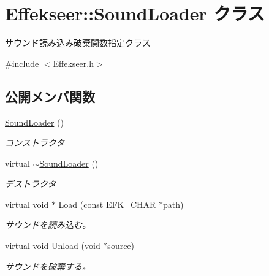 \hypertarget{class_effekseer_1_1_sound_loader}{}\section{Effekseer\+:\+:Sound\+Loader クラス}
\label{class_effekseer_1_1_sound_loader}


サウンド読み込み破棄関数指定クラス  




{\ttfamily \#include $<$Effekseer.\+h$>$}

\subsection*{公開メンバ関数}
\begin{DoxyCompactItemize}
\item 
\mbox{\hyperlink{class_effekseer_1_1_sound_loader_a8c1e855efae5426d991a534950ffd0d2}{Sound\+Loader}} ()
\begin{DoxyCompactList}\small\item\em コンストラクタ \end{DoxyCompactList}\item 
virtual \mbox{\hyperlink{class_effekseer_1_1_sound_loader_af0d4636a5348e45dfadf0e0a8847d4c1}{$\sim$\+Sound\+Loader}} ()
\begin{DoxyCompactList}\small\item\em デストラクタ \end{DoxyCompactList}\item 
virtual \mbox{\hyperlink{namespace_effekseer_ab34c4088e512200cf4c2716f168deb56}{void}} $\ast$ \mbox{\hyperlink{class_effekseer_1_1_sound_loader_a871ad4843c0dee971d897a654643bdef}{Load}} (const \mbox{\hyperlink{_effekseer_8h_a50b026abea014b47854bcd835b3b6233}{E\+F\+K\+\_\+\+C\+H\+AR}} $\ast$path)
\begin{DoxyCompactList}\small\item\em サウンドを読み込む。 \end{DoxyCompactList}\item 
virtual \mbox{\hyperlink{namespace_effekseer_ab34c4088e512200cf4c2716f168deb56}{void}} \mbox{\hyperlink{class_effekseer_1_1_sound_loader_aa0b0fda4cbd0f9a6b9bf1babaef93679}{Unload}} (\mbox{\hyperlink{namespace_effekseer_ab34c4088e512200cf4c2716f168deb56}{void}} $\ast$source)
\begin{DoxyCompactList}\small\item\em サウンドを破棄する。 \end{DoxyCompactList}\end{DoxyCompactItemize}


